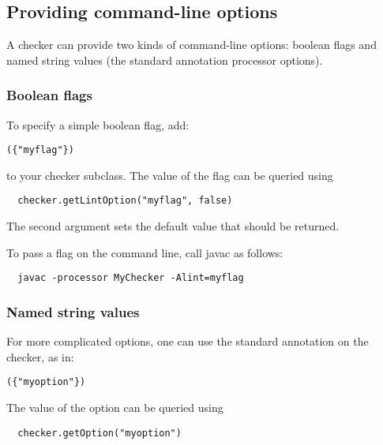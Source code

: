 \subsection{Providing command-line options\label{creating-providing-command-line-options}}

A checker can provide two kinds of command-line options:
boolean flags and
named string values (the standard annotation processor
options).

\subsubsection{Boolean flags\label{creating-providing-command-line-options-boolean-flags}}

To specify a simple boolean flag, add:

\begin{alltt}
  (\{"myflag"\})
\end{alltt}

to your checker subclass.
The value of the flag can be queried using

\begin{Verbatim}
  checker.getLintOption("myflag", false)
\end{Verbatim}

The second argument sets the default value that should be returned.

To pass a flag on the command line, call javac as follows:

\begin{Verbatim}
  javac -processor MyChecker -Alint=myflag
\end{Verbatim}


\subsubsection{Named string values\label{creating-providing-command-line-options-named-string-values}}

For more complicated options, one can use the standard
 annotation on the checker, as in:

\begin{alltt}
  (\{"myoption"\})
\end{alltt}

The value of the option can be queried using

\begin{Verbatim}
  checker.getOption("myoption")
\end{Verbatim}

